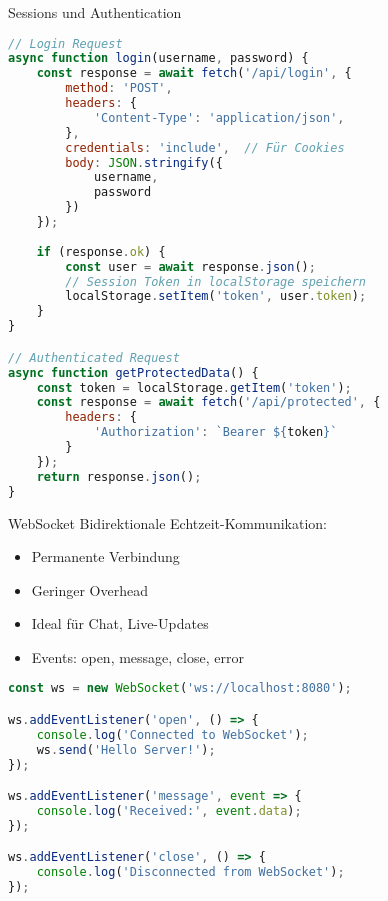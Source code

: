 \begin{KR}{Sessions und Authentication}
\begin{lstlisting}[language=JavaScript, style=basesmol]
// Login Request
async function login(username, password) {
    const response = await fetch('/api/login', {
        method: 'POST',
        headers: {
            'Content-Type': 'application/json',
        },
        credentials: 'include',  // Für Cookies
        body: JSON.stringify({
            username,
            password
        })
    });
    
    if (response.ok) {
        const user = await response.json();
        // Session Token in localStorage speichern
        localStorage.setItem('token', user.token);
    }
}

// Authenticated Request
async function getProtectedData() {
    const token = localStorage.getItem('token');
    const response = await fetch('/api/protected', {
        headers: {
            'Authorization': `Bearer ${token}`
        }
    });
    return response.json();
}
\end{lstlisting}
\end{KR}

\begin{concept}{WebSocket}
    Bidirektionale Echtzeit-Kommunikation:
    \begin{itemize}
        \item Permanente Verbindung
        \item Geringer Overhead
        \item Ideal für Chat, Live-Updates
        \item Events: open, message, close, error
    \end{itemize}

\begin{lstlisting}[language=JavaScript, style=basesmol]
const ws = new WebSocket('ws://localhost:8080');

ws.addEventListener('open', () => {
    console.log('Connected to WebSocket');
    ws.send('Hello Server!');
});

ws.addEventListener('message', event => {
    console.log('Received:', event.data);
});

ws.addEventListener('close', () => {
    console.log('Disconnected from WebSocket');
});
\end{lstlisting}
\end{concept}
